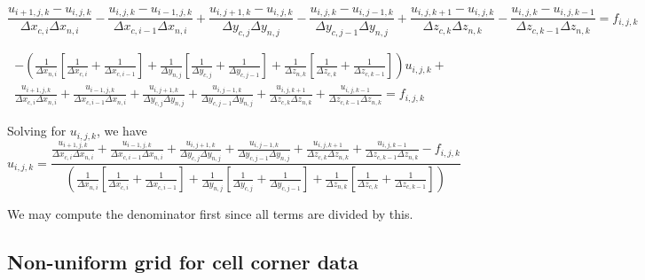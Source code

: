 \documentclass[11pt]{article}
\begin{document}
\begin{equation}
	\frac{u_{i+1,j,k}-u_{i,j,k}}{\Delta x_{c,i} \Delta x_{n,i}} - \frac{u_{i,j,k}-u_{i-1,j,k}}{\Delta x_{c,i-1} \Delta x_{n,i}} + 
	\frac{u_{i,j+1,k}-u_{i,j,k}}{\Delta y_{c,j} \Delta y_{n,j}} - \frac{u_{i,j,k}-u_{i,j-1,k}}{\Delta y_{c,j-1} \Delta y_{n,j}} +
	\frac{u_{i,j,k+1}-u_{i,j,k}}{\Delta z_{c,k} \Delta z_{n,k}} - \frac{u_{i,j,k}-u_{i,j,k-1}}{\Delta z_{c,k-1} \Delta z_{n,k}} = f_{i,j,k}
\end{equation}


\begin{multline}
	-\left( 
	\frac{ 1 }{ \Delta x_{n,i} }
	\left[
	\frac{ 1 }{ \Delta x_{c,i} } +
	\frac{ 1 }{ \Delta x_{c,i-1} }
	\right] +
	\frac{ 1 }{ \Delta y_{n,j} }
	\left[
	\frac{ 1 }{ \Delta y_{c,j} } +
	\frac{ 1 }{ \Delta y_{c,j-1} }
	\right] +
	\frac{ 1 }{ \Delta z_{n,k} }
	\left[
	\frac{ 1 }{ \Delta z_{c,k} } +
	\frac{ 1 }{ \Delta z_{c,k-1} }
	\right]
	\right) u_{i,j,k}
	+ \\
	\frac{u_{i+1,j,k}}{\Delta x_{c,i} \Delta x_{n,i}} + \frac{u_{i-1,j,k}}{\Delta x_{c,i-1} \Delta x_{n,i}} + 
	\frac{u_{i,j+1,k}}{\Delta y_{c,j} \Delta y_{n,j}} + \frac{u_{i,j-1,k}}{\Delta y_{c,j-1} \Delta y_{n,j}} +
	\frac{u_{i,j,k+1}}{\Delta z_{c,k} \Delta z_{n,k}} + \frac{u_{i,j,k-1}}{\Delta z_{c,k-1} \Delta z_{n,k}} = f_{i,j,k}
\end{multline}

Solving for $u_{i,j,k}$, we have
\begin{equation}
	u_{i,j,k} = 
	\frac{ 
	\frac{u_{i+1,j,k}}{\Delta x_{c,i} \Delta x_{n,i}} + \frac{u_{i-1,j,k}}{\Delta x_{c,i-1} \Delta x_{n,i}} + 
	\frac{u_{i,j+1,k}}{\Delta y_{c,j} \Delta y_{n,j}} + \frac{u_{i,j-1,k}}{\Delta y_{c,j-1} \Delta y_{n,j}} +
	\frac{u_{i,j,k+1}}{\Delta z_{c,k} \Delta z_{n,k}} + \frac{u_{i,j,k-1}}{\Delta z_{c,k-1} \Delta z_{n,k}}
	- f_{i,j,k} }{
	\left( 
	\frac{ 1 }{ \Delta x_{n,i} }
	\left[
	\frac{ 1 }{ \Delta x_{c,i} } +
	\frac{ 1 }{ \Delta x_{c,i-1} }
	\right] +
	\frac{ 1 }{ \Delta y_{n,j} }
	\left[
	\frac{ 1 }{ \Delta y_{c,j} } +
	\frac{ 1 }{ \Delta y_{c,j-1} }
	\right] +
	\frac{ 1 }{ \Delta z_{n,k} }
	\left[
	\frac{ 1 }{ \Delta z_{c,k} } +
	\frac{ 1 }{ \Delta z_{c,k-1} }
	\right]
	\right)
	}
\end{equation}

We may compute the denominator first since all terms are divided by this.


\subsection{Non-uniform grid for cell corner data}
\end{document}
